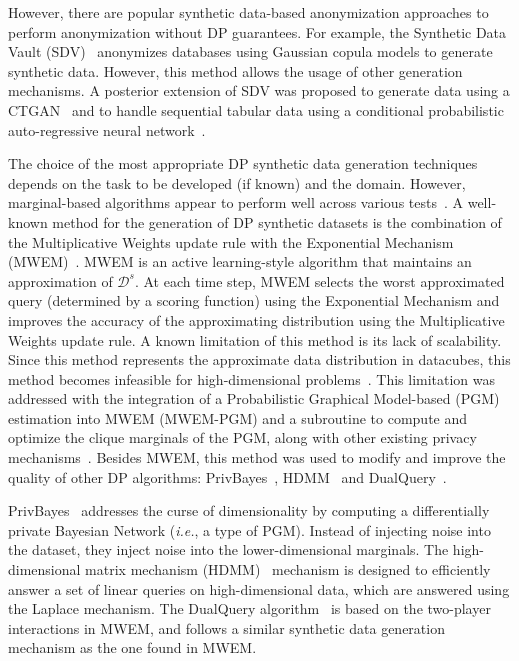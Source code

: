 However, there are popular synthetic data-based anonymization approaches to
perform anonymization without DP guarantees. For example, the Synthetic Data
Vault (SDV)~\cite{patki2016synthetic} anonymizes databases using Gaussian
copula models to generate synthetic data. However, this method allows the
usage of other generation mechanisms. A posterior extension of SDV was
proposed to generate data using a CTGAN~\cite{xu2019modeling} and to handle
sequential tabular data using a conditional probabilistic auto-regressive
neural network~\cite{zhang2022sequential}. 

The choice of the most appropriate DP synthetic data generation techniques
depends on the task to be developed (if known) and the domain. However,
marginal-based algorithms appear to perform well across various
tests~\cite{tao2021benchmarking}. A well-known method for the generation of DP
synthetic datasets is the combination of the Multiplicative Weights update
rule with the Exponential Mechanism (MWEM)~\cite{hardt2012simple}. MWEM is an
active learning-style algorithm that maintains an approximation of
$\mathcal{D}^s$. At each time step, MWEM selects the worst approximated query
(determined by a scoring function) using the Exponential Mechanism and
improves the accuracy of the approximating distribution using the
Multiplicative Weights update rule. A known limitation of this method is its
lack of scalability. Since this method represents the approximate data
distribution in datacubes, this method becomes infeasible for high-dimensional
problems~\cite{mckenna2019graphical}. This limitation was addressed with the
integration of a Probabilistic Graphical Model-based (PGM) estimation into
MWEM (MWEM-PGM) and a subroutine to compute and optimize the clique marginals
of the PGM, along with other existing privacy
mechanisms~\cite{mckenna2019graphical}. Besides MWEM, this method was used to
modify and improve the quality of other DP algorithms:
PrivBayes~\cite{zhang2017privbayes}, HDMM~\cite{mckenna2018optimizing} and
DualQuery~\cite{gaboardi2014dual}.

PrivBayes~\cite{zhang2017privbayes} addresses the curse of dimensionality by
computing a differentially private Bayesian Network (\textit{i.e.}, a type of
PGM). Instead of injecting noise into the dataset, they inject noise into the
lower-dimensional marginals. The high-dimensional matrix mechanism
(HDMM)~\cite{mckenna2018optimizing} mechanism is designed to efficiently
answer a set of linear queries on high-dimensional data, which are answered
using the Laplace mechanism. The DualQuery algorithm~\cite{gaboardi2014dual}
is based on the two-player interactions in MWEM, and follows a similar
synthetic data generation mechanism as the one found in MWEM\@.

